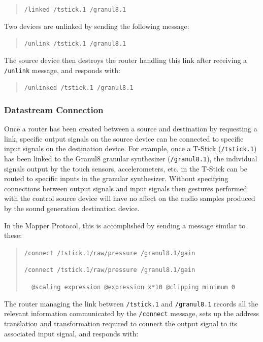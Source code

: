 \begin{quote}
\verb#/linked /tstick.1 /granul8.1#
\end{quote}

Two devices are unlinked by sending the following message:

\begin{quote}
\verb#/unlink /tstick.1 /granul8.1#
\end{quote}

The source device then destroys the router handling this link after receiving a \verb#/unlink# message, and responds with:

\begin{quote}
\verb#/unlinked /tstick.1 /granul8.1#
\end{quote}

\subsubsection{Datastream Connection}

Once a router has been created between a source and destination by requesting a link, specific output signals on the source device can be connected to specific input signals on the destination device. For example, once a T-Stick (\verb#/tstick.1#) has been linked to the Granul8 granular synthesizer (\verb#/granul8.1#), the individual signals output by the touch sensors, accelerometers, etc. in the T-Stick can be routed to specific inputs in the granular synthesizer. Without specifying connections between output signals and input signals then gestures performed with the control source device will have no affect on the audio samples produced by the sound generation destination device. 

In the Mapper Protocol, this is accomplished by sending a message similar to these:

\begin{quote}
\verb#/connect /tstick.1/raw/pressure /granul8.1/gain#

\verb#/connect /tstick.1/raw/pressure /granul8.1/gain#

\verb#  @scaling expression @expression x*10 @clipping minimum 0#
\end{quote}

The router managing the link between \verb#/tstick.1# and \verb#/granul8.1# records all the relevant information communicated by the \verb#/connect# message, sets up the address translation and transformation required to connect the output signal to its associated input signal, and responds with:

